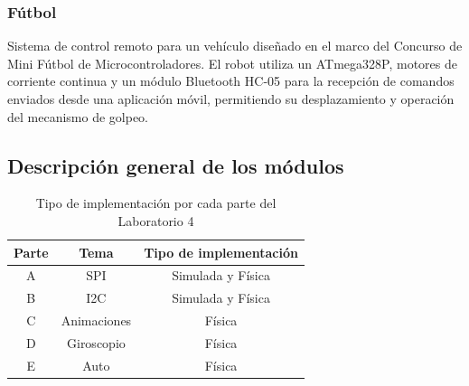 \subsubsection{Fútbol}
Sistema de control remoto para un vehículo diseñado en el marco del Concurso de Mini Fútbol de Microcontroladores. El robot utiliza un ATmega328P, motores de corriente continua y un módulo Bluetooth HC-05 para la recepción de comandos enviados desde una aplicación móvil, permitiendo su desplazamiento y operación del mecanismo de golpeo.

\vspace{1.5em}

\subsection{Descripción general de los módulos}

\begin{table}[H]
\centering
\caption{Tipo de implementación por cada parte del Laboratorio 4}
\begin{tabular}{@{}ccc@{}}
\toprule
\textbf{Parte} & \textbf{Tema} & \textbf{Tipo de implementación} \\ \midrule
A & SPI & Simulada y Física \\
B & I2C & Simulada y Física \\
C & Animaciones & Física \\
D & Giroscopio & Física \\
E & Auto & Física \\ \bottomrule
\end{tabular}
\label{tab:implementacion_lab4}
\end{table}
